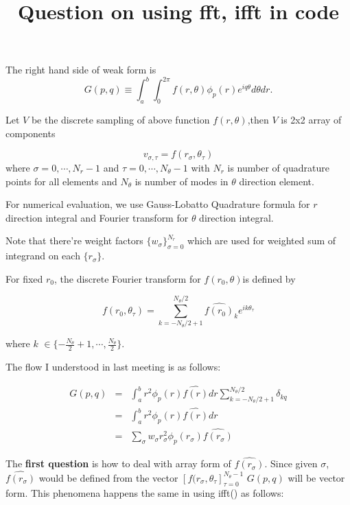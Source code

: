 \documentclass[11pt,letterpaper]{article}
\begin{document}
\title{{\bfseries Question on using fft, ifft in code} }
The right hand side of weak form is  \begin{equation} G(p,q)
\equiv \int_a^b \int_0^{2\pi} f(r, \theta)\phi_p(r) e^{iq\theta}
d\theta dr. \end{equation}

Let $V$ be the discrete sampling of above function $f(r,
\theta)$,then $V$ is 2x2 array of components

\begin{equation}
v_{\sigma,\tau} = f(r_\sigma, \theta_\tau)
\end{equation}
where $\sigma = 0, \cdots, N_r-1$ and $\tau=0,
\cdots, N_\theta-1$ with $N_r$ is number of quadrature points for
all elements and $N_\theta$ is number of modes in $\theta$
direction element.

For numerical evaluation, we use Gauss-Lobatto Quadrature formula
for $r$ direction integral and Fourier transform for $\theta$
direction integral.

Note that there're weight factors $\{w_\sigma\}_{\sigma =0}^{N_r}$
which are used for weighted sum of integrand on each
$\{r_\sigma\}$.


For fixed $r_0$, the discrete Fourier transform for $f(r_0,
\theta)$is defined by

\begin{equation} f(r_0, \theta_\tau) =
\sum_{k=-N_\theta/2+1}^{N_\theta/2} \widehat{f(r_0)}_k
e^{ik\theta_\tau} \end{equation}

where $k$ $\in \{-\frac{N_\theta}{2}+1, \cdots,
\frac{N_\theta}{2}\}$.

The flow I understood in last meeting is as follows:

\begin{eqnarray}
G(p, q) &=& \int_a^b r^2\phi_p(r) \widehat{f(r)} dr \sum_{k=-N_\theta/2+1}^{N_\theta/2} \delta_{kq} \\
        &=& \int_a^b r^2\phi_p(r) \widehat{f(r)} dr \\
        &=& \sum_\sigma w_\sigma r_\sigma^2\phi_p(r_\sigma) \widehat{f(r_\sigma)}
\end{eqnarray}

The \textbf{first question} is how to deal with array form of
$\widehat{f(r_\sigma)}$. Since given $\sigma $,
$\widehat{f(r_\sigma)}$ would be defined from the vector
$[f(r_\sigma, \theta_\tau]_{\tau=0}^{N_\theta-1}$  $G(p, q) $ will
be vector form. This phenomena happens the same in using ifft() as
follows:
\end{document}
